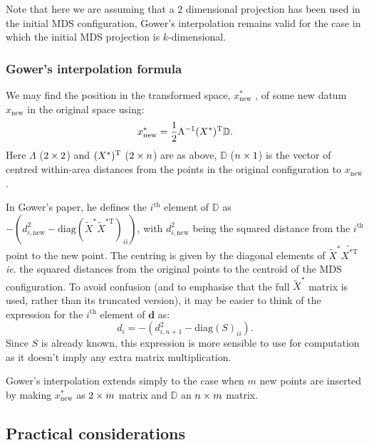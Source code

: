 Note that here we are assuming that a 2 dimensional projection has been used in the initial MDS configuration, Gower's interpolation remains valid for the case in which the initial MDS projection is $k$-dimensional.

\subsubsection{Gower's interpolation formula}

We may find the position in the transformed space, $x^*_{\text{new}}$ , of some new datum $x_{\text{new}}$ in the original space using:
\begin{equation}
x^*_{\text{new}} = \frac{1}{2} \Lambda^{-1} (X^*)^{\text{T}} \mathbb{D}.
\label{gower}
\end{equation}
Here $\Lambda$ ($2 \times 2$) and $(X^*)^{\text{T}}$ ($2 \times n$) are as above, $\mathbb{D}$ ($n \times 1$) is the vector of centred within-area distances from the points in the original configuration to $x_{\text{new}}$.

In Gower's paper, he defines the $i^\text{th}$ element of $\mathbb{D}$ as $-(d^2_{i,\text{new}}-\text{diag}(\tilde{X}^* \tilde{X}^{*\text{T}})_{ii})$, with $d^2_{i,\text{new}}$ being the squared distance from the $i^\text{th}$ point to the new point. The centring is given by the diagonal elements of $\tilde{X}^*\tilde{X^{* \text{T}}}$ \emph{ie}. the squared distances from the original points to the centroid of the MDS configuration. To avoid confusion (and to emphasise that the full $\tilde{X}^*$ matrix is used, rather than its truncated version), it may be easier to think of the expression for the $i^\text{th}$ element of $\bm{d}$ as:
\begin{equation}
d_{i} = -(d^2_{i,n+1}-\text{diag}(S)_{ii}).
\end{equation}
Since $S$ is already known, this expression is more sensible to use for computation as it doesn't imply any extra matrix multiplication.

Gower's interpolation extends simply to the case when $m$ new points are inserted by making $x^*_{\text{new}}$ as $2 \times m$ matrix and $\mathbb{D}$ an $n \times m$ matrix.


\subsection{Practical considerations}

